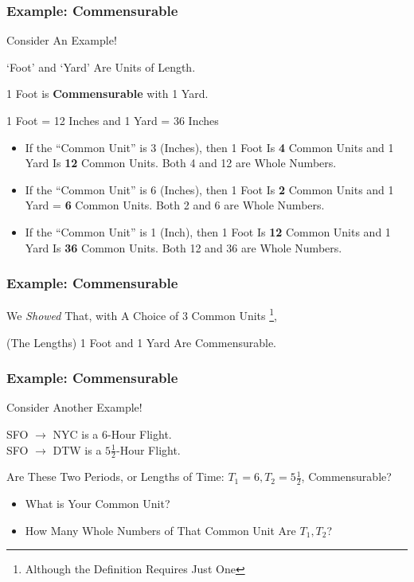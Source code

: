 \documentclass{beamer}
\begin{document}
\begin{frame}
\frametitle{Example: Commensurable}
Consider An Example!
\begin{example}
`Foot' and `Yard' Are Units of Length.

\pause

1 Foot is \textbf{Commensurable} with 1 Yard. 

\pause

1 Foot = 12 Inches and 1 Yard = 36 Inches
\pause
\begin{itemize}
\item If the ``Common Unit'' is 3 (Inches), then 1 Foot Is \textbf{4} Common Units and 1 Yard Is \textbf{12} Common Units. Both 4 and 12 are Whole Numbers.
\pause
\item If the ``Common Unit'' is 6 (Inches), then 1 Foot Is \textbf{2} Common Units and 1 Yard = \textbf{6} Common Units. Both 2 and 6 are Whole Numbers.
\pause
\item If the ``Common Unit'' is 1 (Inch), then 1 Foot Is \textbf{12} Common Units and 1 Yard Is \textbf{36} Common Units. Both 12 and 36 are Whole Numbers.
\pause
\end{itemize}
\end{example}
\end{frame}

\begin{frame}
\frametitle{Example: Commensurable}
We \textit{Showed} That, with A Choice of 3 Common Units
\footnote{Although the Definition Requires Just One},

\pause

(The Lengths) 1 Foot and 1 Yard Are Commensurable.
\end{frame}

\begin{frame}
\frametitle{Example: Commensurable}
Consider Another Example!
\begin{example}
SFO $\rightarrow$ NYC is a 6-Hour Flight.\\
SFO $\rightarrow$ DTW is a $5\frac{1}{2}$-Hour Flight.

Are These Two Periods, or Lengths of Time: $T_1=6,T_2=5\frac{1}{2}$, Commensurable?
\pause
\begin{itemize}
\item What is Your Common Unit?
\pause
\item How Many Whole Numbers of That Common Unit Are $T_1,T_2$?
\end{itemize}
\end{example}
\end{frame}
\end{document}
